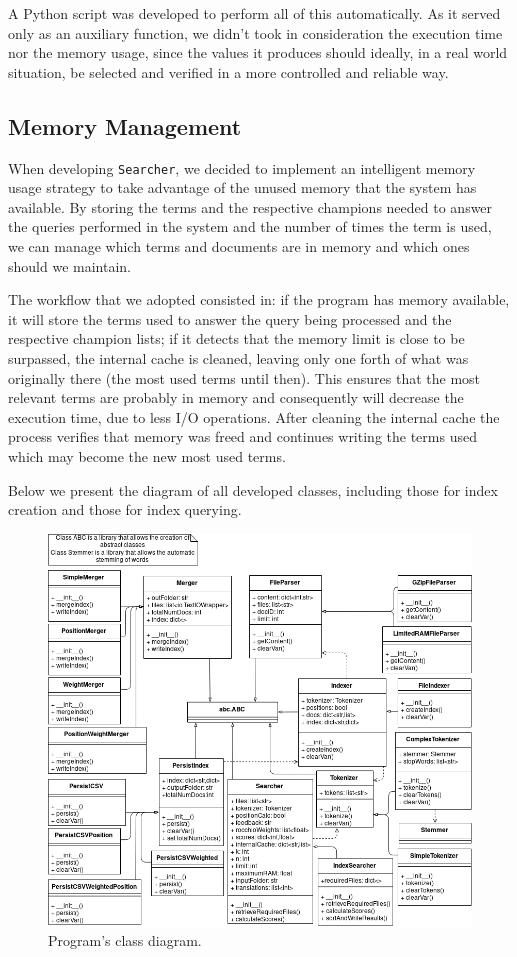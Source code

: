 \documentclass[12pt]{article}
\begin{document}
A Python script was developed to perform all of this automatically.
As it served only as an auxiliary function, we didn't took in consideration the 
execution time nor the memory usage, since the values it produces should ideally, 
in a real world situation, be selected and verified in a more controlled and reliable way.

\subsection{Memory Management} \label{memory}

When developing \texttt{Searcher}, we decided to implement an intelligent memory
usage strategy to take advantage of the unused memory that the system has available. 
By storing the terms and the respective champions needed to answer the queries 
performed in the system and the number of times the term is used, we can manage 
which terms and documents are in memory and which ones should we maintain.

The workflow that we adopted consisted in: if the program has memory available, 
it will store the terms used to answer the query being processed and the 
respective champion lists; if it detects that the memory limit is close to be 
surpassed, the internal cache is cleaned, leaving only one forth of what was 
originally there (the most used terms until then). 
This ensures that the most relevant terms are probably in memory and consequently 
will decrease the execution time, due to less I/O operations. 
After cleaning the internal cache the process verifies that memory was freed and 
continues writing the terms used which may become the new most used terms.

Below we present the diagram of all developed classes, including those for index 
creation and those for index querying.

\begin{figure}[h!]
\includegraphics[width=\linewidth]{ClassDiagram_assign3.png}
\caption{Program's class diagram.}
\label{fig:classdiagram}
\end{figure}
\end{document}

